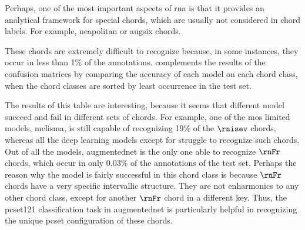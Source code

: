 
Perhaps, one of the most important aspects of \gls{rna} is
that it provides an analytical framework for special chords,
which are usually not considered in chord labels. For
example, \gls{neapolitan} or \gls{augsix} chords.

These chords are extremely difficult to recognize because,
in some instances, they occur in less than 1\% of the
annotations.  complements the results of
the confusion matrices by comparing the accuracy of each
model on each chord class, when the chord classes are sorted
by least occurrence in the test set.

The results of this table are interesting, because it seems
that different model succeed and fail in different sets of
chords. For example, one of the mos limited models,
\gls{melisma}, is still capable of recognizing 19\% of the
$\rnisev$ chords, whereas all the deep learning models
except for \textcite{mcleod2021modular} struggle to
recognize such chords. Out of all the models,
\gls{augmentednet} is the only one able to recognize $\rnFr$
chords, which occur in only 0.03\% of the annotations of the
test set. Perhaps the reason why the model is fairly
successful in this chord class is because $\rnFr$ chords
have a very specific intervallic structure. They are not
enharmonics to any other chord class, except for another
$\rnFr$ chord in a different key. Thus, the \gls{pcset121}
classification task in \gls{augmentednet} is particularly
helpful in recognizing the unique \gls{pcset} configuration
of these chords.


